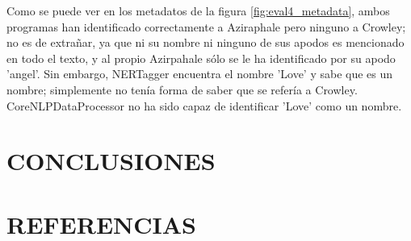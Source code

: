 \documentclass{pre-tfg}
\begin{document}
Como se puede ver en los metadatos de la figura \ref{fig:eval4_metadata}, ambos programas han identificado correctamente a Aziraphale pero ninguno a Crowley; no es de extrañar, ya que ni su nombre ni ninguno de sus apodos es mencionado en todo el texto, y al propio Azirpahale sólo se le ha identificado por su apodo 'angel'. Sin embargo, NERTagger encuentra el nombre 'Love' y sabe que es un nombre; simplemente no tenía forma de saber que se refería a Crowley. CoreNLPDataProcessor no ha sido capaz de identificar 'Love' como un nombre.


\cleardoublepage

\section{CONCLUSIONES}

\section{REFERENCIAS}





\singlespacing
%

\end{document}
